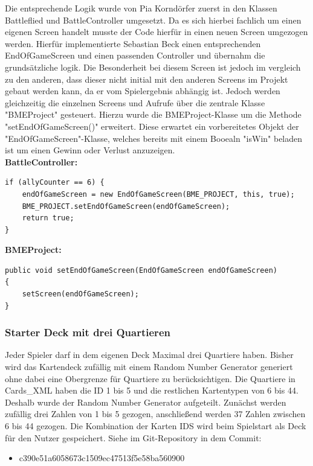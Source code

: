 Die entsprechende Logik wurde von Pia Korndörfer zuerst in den Klassen Battleflied und BattleController umgesetzt. Da es sich hierbei fachlich um einen eigenen Screen handelt musste der Code hierfür in einen neuen Screen umgezogen werden. Hierfür implementierte Sebastian Beck einen entsprechenden EndOfGameScreen und einen passenden Controller und übernahm die grundsätzliche logik. Die Besonderheit bei diesem Screen ist jedoch im vergleich zu den anderen, dass dieser nicht initial mit den anderen Screens im Projekt gebaut werden kann, da er vom Spielergebnis abhängig ist. Jedoch werden gleichzeitig die einzelnen Screens und Aufrufe über die zentrale Klasse "BMEProject" gesteuert. Hierzu wurde die BMEProject-Klasse um die Methode "setEndOfGameScreen()" erweitert. Diese erwartet ein vorbereitetes Objekt der "EndOfGameScreen"-Klasse, welches bereits mit einem Booealn "isWin" beladen ist um einen Gewinn oder Verlust anzuzeigen. \\
\textbf{BattleController:}
\begin{lstlisting}
if (allyCounter == 6) {
	endOfGameScreen = new EndOfGameScreen(BME_PROJECT, this, true);
	BME_PROJECT.setEndOfGameScreen(endOfGameScreen);
	return true;
}
\end{lstlisting}
\textbf{BMEProject:}
\begin{lstlisting}
public void setEndOfGameScreen(EndOfGameScreen endOfGameScreen)
{
	setScreen(endOfGameScreen);
}
\end{lstlisting}

\subsubsection{Starter Deck mit drei Quartieren}
Jeder Spieler darf in dem eigenen Deck Maximal drei Quartiere haben. Bisher wird das Kartendeck zufällig mit einem Random Number Generator generiert ohne dabei eine Obergrenze für Quartiere zu berücksichtigen. Die Quartiere in Cards\_XML haben die ID 1 bis 5 und die restlichen Kartentypen von 6 bis 44. Deshalb wurde der Random Number Generator aufgeteilt. Zunächst werden zufällig drei Zahlen von 1 bis 5 gezogen, anschließend werden 37 Zahlen zwischen 6 bis 44 gezogen. Die Kombination der Karten IDS wird beim Spielstart als Deck für den Nutzer gespeichert.
Siehe im Git-Repository in dem Commit:
\begin{itemize}
\item c390e51a6058673c1509ec47513f5e58ba560900
\end{itemize}


